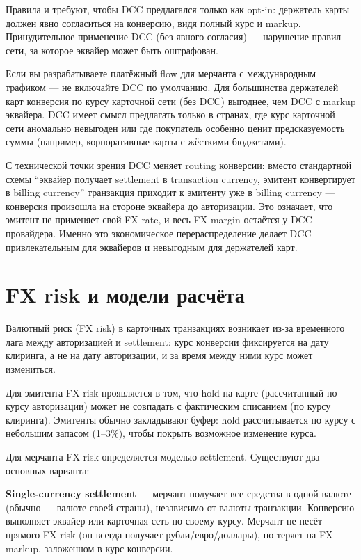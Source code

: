 Правила  и  требуют,
чтобы DCC предлагался только как opt-in: держатель карты должен
явно согласиться на конверсию, видя полный курс и markup.
Принудительное применение DCC (без явного согласия) —
нарушение правил сети, за которое эквайер может быть
оштрафован.

\begin{kaobox}[title=На практике]
  Если вы разрабатываете платёжный flow для мерчанта
  с международным трафиком — не включайте DCC по умолчанию.
  Для большинства держателей карт конверсия по курсу карточной
  сети (без DCC) выгоднее, чем DCC с markup эквайера.
  DCC имеет смысл предлагать только в странах, где курс
  карточной сети аномально невыгоден или где покупатель
  особенно ценит предсказуемость суммы (например,
  корпоративные карты с жёсткими бюджетами).
\end{kaobox}

С технической точки зрения DCC меняет routing конверсии:
вместо стандартной схемы \enquote{эквайер получает settlement
  в transaction currency, эмитент конвертирует в billing currency}
транзакция приходит к эмитенту уже в billing currency —
конверсия произошла на стороне эквайера до авторизации.
Это означает, что эмитент не применяет свой FX rate,
и весь FX margin остаётся у DCC-провайдера. Именно
это экономическое перераспределение делает DCC привлекательным
для эквайеров и невыгодным для держателей карт.

\section{FX risk и модели расчёта}
\label{sec:mc-fx-risk}

Валютный риск (FX risk) в карточных транзакциях возникает
из-за временного лага между авторизацией и settlement:
курс конверсии фиксируется на дату клиринга, а не на дату
авторизации, и за время между ними курс может измениться.

Для эмитента FX risk проявляется в том, что hold
на карте (рассчитанный по курсу авторизации) может не совпадать
с фактическим списанием (по курсу клиринга). Эмитенты
обычно закладывают буфер: hold рассчитывается по курсу
с небольшим запасом (1--3\%), чтобы покрыть возможное
изменение курса.

Для мерчанта FX risk определяется моделью settlement.
Существуют два основных варианта:

\textbf{Single-currency settlement} — мерчант получает
все средства в одной валюте (обычно — валюте своей страны),
независимо от валюты транзакции. Конверсию выполняет
эквайер или карточная сеть по своему курсу. Мерчант не несёт
прямого FX risk (он всегда получает рубли/евро/доллары),
но теряет на FX markup, заложенном в курс конверсии.

